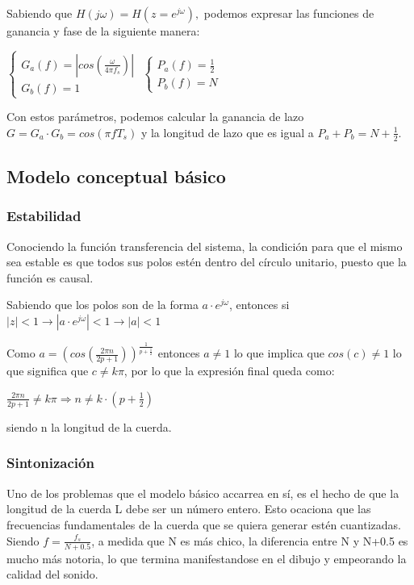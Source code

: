 \documentclass[../ASSD_TP2.tex]{subfiles}
\begin{document}
Sabiendo que $H(j\omega)=H(z=e^{j\omega}),$ podemos expresar las
funciones de ganancia y fase de la siguiente manera:
\begin{center}
$\begin{cases}
G_{a}(f)=|cos(\frac{\omega}{4\pi f_{s}})|\\
G_{b}(f)=1
\end{cases}$ $\begin{cases}
P_{a}(f)=\frac{1}{2}\\
P_{b}(f)=N
\end{cases}$
\par\end{center}

Con estos parámetros, podemos calcular la ganancia de lazo $G=G_{a}\cdot G_{b}=cos(\pi fT_{s})$
y la longitud de lazo que es igual a $P_{a}+P_{b}=N+\frac{1}{2}$.

\subsection{Modelo conceptual básico}

\subsubsection{Estabilidad}

Conociendo la función transferencia del sistema, la condición para
que el mismo sea estable es que todos sus polos estén dentro del círculo
unitario, puesto que la función es causal.

Sabiendo que los polos son de la forma $a\cdot e^{j\omega}$, entonces
si $|z|<1\rightarrow|a\cdot e^{j\omega}|<1\rightarrow|a|<1$

Como $a=(cos(\frac{2\pi n}{2p+1}))^{\frac{1}{p+\frac{1}{2}}}$ entonces
$a\neq1$ lo que implica que $cos(c)\neq1$ lo que significa que $c\neq k\pi$,
por lo que la expresión final queda como:
\begin{center}
$\frac{2\pi n}{2p+1}\neq k\pi\Rightarrow n\neq k\cdot(p+\frac{1}{2})$
\par\end{center}

siendo n la longitud de la cuerda.

\subsubsection{Sintonización}

Uno de los problemas que el modelo básico accarrea en sí, es el hecho
de que la longitud de la cuerda L debe ser un número entero. Esto
ocaciona que las frecuencias fundamentales de la cuerda que se quiera
generar estén cuantizadas. Siendo $f=\frac{f_{s}}{N+0.5}$, a medida
que N es más chico, la diferencia entre N y N+0.5 es mucho más notoria,
lo que termina manifestandose en el dibujo y empeorando la calidad
del sonido.
\end{document}

